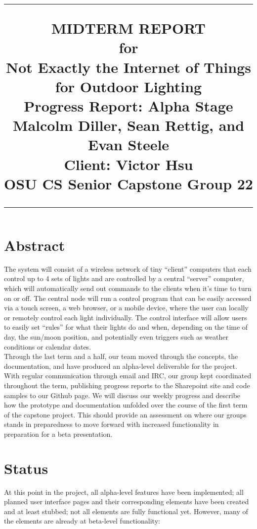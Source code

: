 \documentclass[oneside,openright]{book}
\title{
	\flushright
		\rule{16cm}{5pt}\vskip1cm
		\Huge{MIDTERM REPORT}\\
	for\\
		\vspace{2cm}
	Not Exactly the Internet of Things for Outdoor Lighting\\
		\vspace{2cm}
	\LARGE{Progress Report:}
	\vspace{2cm}
	\LARGE{Alpha Stage\\}
	\vspace{2cm}
	Malcolm Diller, Sean Rettig, and Evan Steele\\
        Client: Victor Hsu\\
        OSU CS Senior Capstone Group 22
		\vfill
		\rule{16cm}{5pt}
}
\date{}
\begin{document}
\maketitle
\tableofcontents
\newpage
{}
\section{Abstract}

The system will consist of a wireless network of tiny ``client'' computers that
each control up to 4 sets of lights and are controlled by a central ``server''
computer, which will automatically send out commands to the clients when it's
time to turn on or off.  The central node will run a control program that can
be easily accessed via a touch screen, a web browser, or a mobile device, where
the user can locally or remotely control each light individually. The control
interface will allow users to easily set ``rules'' for what their lights do and
when, depending on the time of day, the sun/moon position, and potentially even
triggers such as weather conditions or calendar dates.\\

Through the last term and a half, our team moved through the concepts, the
documentation, and have produced an alpha-level deliverable for the project.
With regular communication through email and IRC, our group kept coordinated
throughout the term, publishing progress reports to the Sharepoint site and
code samples to our Github page. We will discuss our weekly progress and
describe how the prototype and documentation unfolded over the course of the
first term of the capstone project. This should provide an assessment on where
our groups stands in preparedness to move forward with increased functionality
in preparation for a beta presentation.

\pagebreak

\section{Status}

At this point in the project, all alpha-level features have been implemented;
all planned user interface pages and their corresponding elements have been
created and at least stubbed; not all elements are fully functional yet.
However, many of the elements are already at beta-level functionality:
\end{document}

